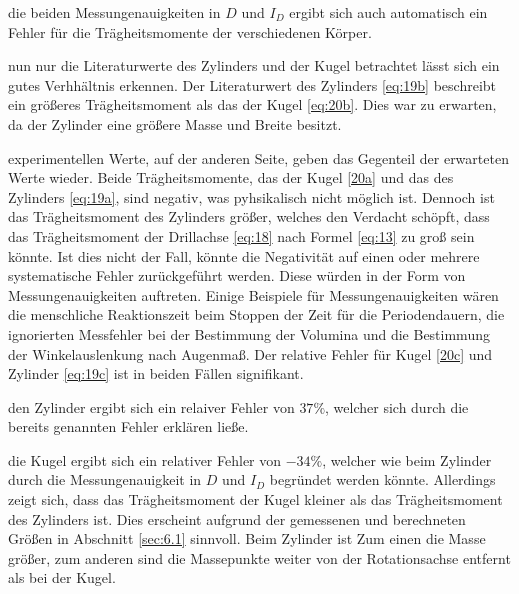 \justifying die beiden Messungenauigkeiten in $D$ und $I_D$ ergibt
sich auch automatisch ein Fehler für die Trägheitsmomente der verschiedenen Körper.

\justifying nun nur die Literaturwerte des Zylinders und der Kugel betrachtet lässt sich ein gutes Verhhältnis erkennen.
Der Literaturwert des Zylinders \eqref{eq:19b} beschreibt ein größeres Trägheitsmoment als das der Kugel \eqref{eq:20b}. Dies war zu erwarten,
da der Zylinder eine größere Masse und Breite besitzt. 

\justifying experimentellen Werte, auf der anderen Seite, geben das Gegenteil der erwarteten Werte wieder. Beide Trägheitsmomente, 
das der Kugel \eqref{20a} und das des Zylinders \eqref{eq:19a}, sind negativ, was pyhsikalisch nicht möglich ist. Dennoch ist das Trägheitsmoment 
des Zylinders größer, welches den Verdacht schöpft, dass das Trägheitsmoment der Drillachse \eqref{eq:18} nach Formel \eqref{eq:13} zu groß 
sein könnte. Ist dies nicht der Fall, könnte die Negativität auf einen oder mehrere systematische Fehler zurückgeführt werden. Diese würden 
in der Form von Messungenauigkeiten auftreten. Einige Beispiele für Messungenauigkeiten wären die menschliche Reaktionszeit beim Stoppen der Zeit
für die Periodendauern, die ignorierten Messfehler bei der Bestimmung der Volumina und die Bestimmung der Winkelauslenkung nach Augenmaß.
Der relative Fehler für Kugel \eqref{20c} und Zylinder \eqref{eq:19c} ist in beiden Fällen signifikant. 


\justifying den Zylinder ergibt sich ein relaiver Fehler von $37\%$, welcher  sich
durch die bereits genannten Fehler erklären ließe. 


\justifying die Kugel ergibt sich ein relativer Fehler von $-34\%$, welcher wie beim Zylinder durch
die Messungenauigkeit in $D$ und $I_D$ begründet werden könnte.
Allerdings zeigt sich, dass das Trägheitsmoment der Kugel kleiner als das Trägheitsmoment
des Zylinders ist. Dies erscheint aufgrund der gemessenen und berechneten Größen in Abschnitt \ref{sec:6.1}
sinnvoll. Beim Zylinder ist Zum einen die Masse größer, zum  anderen sind die Massepunkte weiter 
von der Rotationsachse entfernt als bei der Kugel.
\newpage

